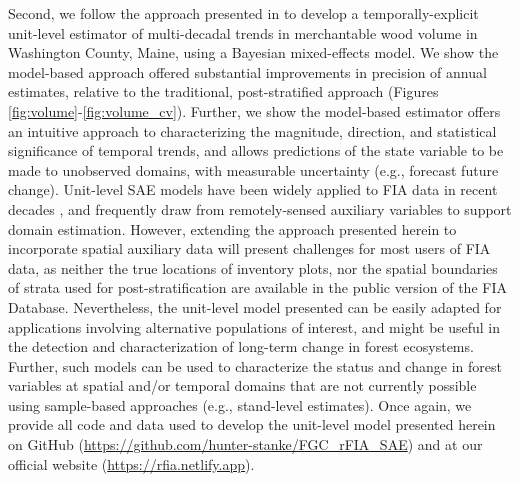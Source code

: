 \documentclass[11pt]{article}
\begin{document}
Second, we follow the approach presented in \citet{little2004model} to develop a temporally-explicit unit-level estimator of multi-decadal trends in merchantable wood volume in Washington County, Maine, using a Bayesian mixed-effects model. We show the model-based approach offered substantial improvements in precision of annual estimates, relative to the traditional, post-stratified approach (Figures \ref{fig:volume}-\ref{fig:volume_cv}). Further, we show the model-based estimator offers an intuitive approach to characterizing the magnitude, direction, and statistical significance of temporal trends, and allows predictions of the state variable to be made to unobserved domains, with measurable uncertainty (e.g., forecast future change). Unit-level SAE models have been widely applied to FIA data in recent decades \citep{goerndt2011comparison, mcroberts2017multivariate, ohmann2002predictive, babcock2018geostatistical}, and frequently draw from remotely-sensed auxiliary variables to support domain estimation. However, extending the approach presented herein to incorporate spatial auxiliary data will present challenges for most users of FIA data, as neither the true locations of inventory plots, nor the spatial boundaries of strata used for post-stratification are available in the public version of the FIA Database. Nevertheless, the unit-level model presented can be easily adapted for applications involving alternative populations of interest, and might be useful in the detection and characterization of long-term change in forest ecosystems. Further, such models can be used to characterize the status and change in forest variables at spatial and/or temporal domains that are not currently possible using sample-based approaches (e.g., stand-level estimates). Once again, we provide all code and data used to develop the unit-level model presented herein on GitHub (\url{https://github.com/hunter-stanke/FGC_rFIA_SAE}) and at our official website (\url{https://rfia.netlify.app}). 
\end{document}
